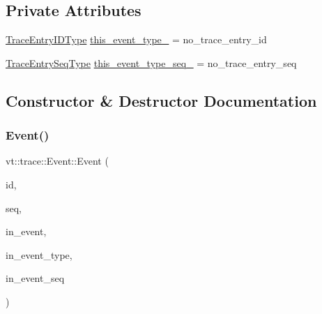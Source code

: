 \subsection*{Private Attributes}
\begin{DoxyCompactItemize}
\item 
\hyperlink{namespacevt_1_1trace_a3c14050715ba9eceaeff51fb3de64f2f}{Trace\+Entry\+I\+D\+Type} \hyperlink{structvt_1_1trace_1_1_event_a51ce0a1bf8edd079479273d794a9820b}{this\+\_\+event\+\_\+type\+\_\+} = no\+\_\+trace\+\_\+entry\+\_\+id
\item 
\hyperlink{namespacevt_1_1trace_a522028dd2a7d056f0ec3d417836fdecd}{Trace\+Entry\+Seq\+Type} \hyperlink{structvt_1_1trace_1_1_event_a915f6b615f2c1ff3dc1e673603a5e0a0}{this\+\_\+event\+\_\+type\+\_\+seq\+\_\+} = no\+\_\+trace\+\_\+entry\+\_\+seq
\end{DoxyCompactItemize}


\subsection{Constructor \& Destructor Documentation}
\mbox{\label{structvt_1_1trace_1_1_event_a6453f6c296f047b7caa653212c09da06}} 
\subsubsection{\texorpdfstring{Event()}{Event()}\hspace{0.1cm}{\footnotesize\ttfamily [1/3]}}
{\footnotesize\ttfamily vt\+::trace\+::\+Event\+::\+Event (\begin{DoxyParamCaption}\item[{\hyperlink{namespacevt_1_1trace_a3c14050715ba9eceaeff51fb3de64f2f}{Trace\+Entry\+I\+D\+Type}}]{id,  }\item[{\hyperlink{namespacevt_1_1trace_a522028dd2a7d056f0ec3d417836fdecd}{Trace\+Entry\+Seq\+Type}}]{seq,  }\item[{std\+::string const \&}]{in\+\_\+event,  }\item[{\hyperlink{namespacevt_1_1trace_a3c14050715ba9eceaeff51fb3de64f2f}{Trace\+Entry\+I\+D\+Type}}]{in\+\_\+event\+\_\+type,  }\item[{\hyperlink{namespacevt_1_1trace_a522028dd2a7d056f0ec3d417836fdecd}{Trace\+Entry\+Seq\+Type}}]{in\+\_\+event\+\_\+seq }\end{DoxyParamCaption})}

